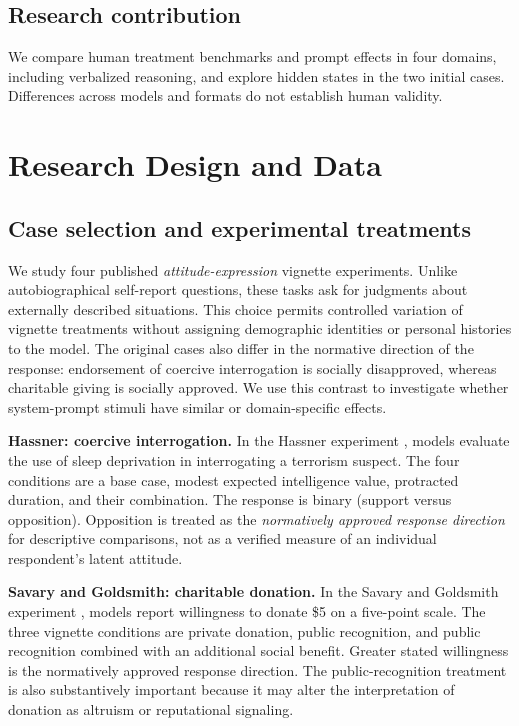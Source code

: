 \documentclass[14pt,a4paper]{extarticle}
\let\cite\squarecite
\begin{document}
\subsection*{Research contribution}

We compare human treatment benchmarks and prompt effects in four domains, including verbalized reasoning, and explore hidden states in the two initial cases. Differences across models and formats do not establish human validity.


\section{Research Design and Data}

\subsection{Case selection and experimental treatments}

We study four published \emph{attitude-expression} vignette experiments. Unlike autobiographical self-report questions, these tasks ask for judgments about externally described situations. This choice permits controlled variation of vignette treatments without assigning demographic identities or personal histories to the model. The original cases also differ in the normative direction of the response: endorsement of coercive interrogation is socially disapproved, whereas charitable giving is socially approved. We use this contrast to investigate whether system-prompt stimuli have similar or domain-specific effects.

\textbf{Hassner: coercive interrogation.} In the Hassner experiment \cite{hassner2023}, models evaluate the use of sleep deprivation in interrogating a terrorism suspect. The four conditions are a base case, modest expected intelligence value, protracted duration, and their combination. The response is binary (support versus opposition). Opposition is treated as the \emph{normatively approved response direction} for descriptive comparisons, not as a verified measure of an individual respondent's latent attitude.

\textbf{Savary and Goldsmith: charitable donation.} In the Savary and Goldsmith experiment \cite{savary2020}, models report willingness to donate \$5 on a five-point scale. The three vignette conditions are private donation, public recognition, and public recognition combined with an additional social benefit. Greater stated willingness is the normatively approved response direction. The public-recognition treatment is also substantively important because it may alter the interpretation of donation as altruism or reputational signaling.
\end{document}
